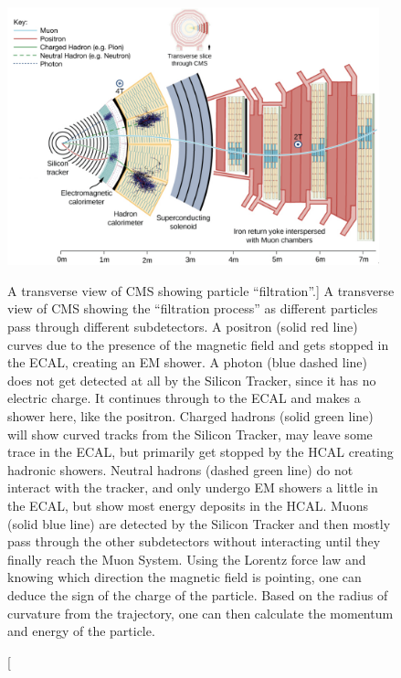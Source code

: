 \begin{figure}[h]
\centering
\includegraphics[width=0.96\textwidth,keepaspectratio]{figures/cms/cms_transverse_particletrajectories_corrected.png}
    \caption
        [A transverse view of CMS showing particle ``filtration''.]
        {
        A transverse view of CMS showing the ``filtration process'' as different particles pass through different subdetectors.
        A positron (solid red line) curves due to the presence of the magnetic field and gets stopped in the ECAL, creating an EM shower.
        A photon (blue dashed line) does not get detected at all by the Silicon Tracker, since it has no electric charge.
        It continues through to the ECAL and makes a shower here, like the positron.
        Charged hadrons (solid green line) will show curved tracks from the Silicon Tracker, may leave some trace in the ECAL, but primarily get stopped by the HCAL creating hadronic showers.
        Neutral hadrons (dashed green line) do not interact with the tracker, and only undergo EM showers a little in the ECAL, but show most energy deposits in the HCAL.
        Muons (solid blue line) are detected by the Silicon Tracker and then mostly pass through the other subdetectors without interacting until they finally reach the Muon System.
        Using the Lorentz force law and knowing which direction the magnetic field is pointing, one can deduce the sign of the charge of the particle. 
        Based on the radius of curvature from the trajectory, one can then calculate the momentum and energy of the particle.
        } 
    \label{fig:cms_particle_trajectories}
\end{figure}
